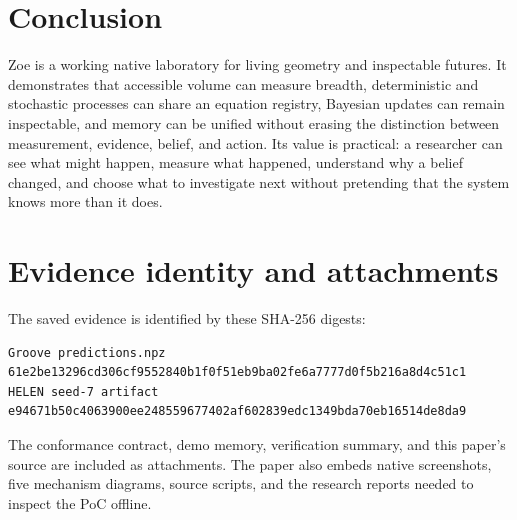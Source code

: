 \documentclass[11pt,a4paper]{article}
\begin{document}
\section{Conclusion}
Zoe is a working native laboratory for living geometry and inspectable futures. It demonstrates that accessible volume can measure breadth, deterministic and stochastic processes can share an equation registry, Bayesian updates can remain inspectable, and memory can be unified without erasing the distinction between measurement, evidence, belief, and action. Its value is practical: a researcher can see what might happen, measure what happened, understand why a belief changed, and choose what to investigate next without pretending that the system knows more than it does.

\appendix
\section{Evidence identity and attachments}
The saved evidence is identified by these SHA-256 digests:
\begin{lstlisting}
Groove predictions.npz
61e2be13296cd306cf9552840b1f0f51eb9ba02fe6a7777d0f5b216a8d4c51c1
HELEN seed-7 artifact
e94671b50c4063900ee248559677402af602839edc1349bda70eb16514de8da9
\end{lstlisting}
The conformance contract, demo memory, verification summary, and this paper's source are included as attachments. The paper also embeds native screenshots, five mechanism diagrams, source scripts, and the research reports needed to inspect the PoC offline.
\end{document}
